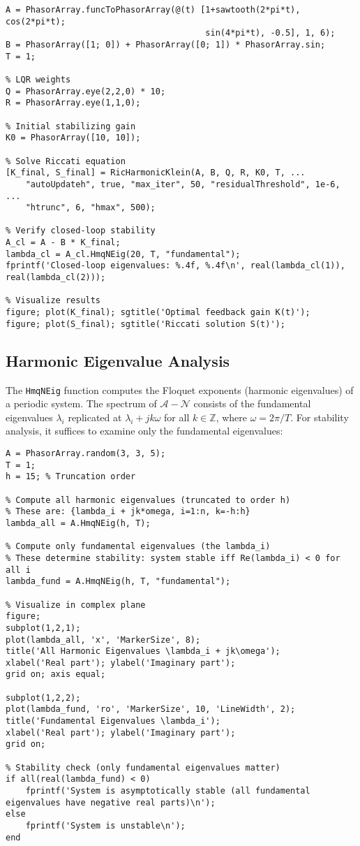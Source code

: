 \documentclass[11pt,a4paper]{article}
\begin{document}
\begin{lstlisting}[style=matlabstyle]
% Define system matrices
A = PhasorArray.funcToPhasorArray(@(t) [1+sawtooth(2*pi*t), cos(2*pi*t); 
                                        sin(4*pi*t), -0.5], 1, 6);
B = PhasorArray([1; 0]) + PhasorArray([0; 1]) * PhasorArray.sin;
T = 1;

% LQR weights
Q = PhasorArray.eye(2,2,0) * 10;
R = PhasorArray.eye(1,1,0);

% Initial stabilizing gain
K0 = PhasorArray([10, 10]);

% Solve Riccati equation
[K_final, S_final] = RicHarmonicKlein(A, B, Q, R, K0, T, ...
    "autoUpdateh", true, "max_iter", 50, "residualThreshold", 1e-6, ...
    "htrunc", 6, "hmax", 500);

% Verify closed-loop stability
A_cl = A - B * K_final;
lambda_cl = A_cl.HmqNEig(20, T, "fundamental");
fprintf('Closed-loop eigenvalues: %.4f, %.4f\n', real(lambda_cl(1)), real(lambda_cl(2)));

% Visualize results
figure; plot(K_final); sgtitle('Optimal feedback gain K(t)');
figure; plot(S_final); sgtitle('Riccati solution S(t)');
\end{lstlisting}

\subsection{Harmonic Eigenvalue Analysis}

The \texttt{HmqNEig} function computes the Floquet exponents (harmonic eigenvalues) of a periodic system. The spectrum of $\mathcal{A} - \mathcal{N}$ consists of the fundamental eigenvalues $\lambda_i$ replicated at $\lambda_i + jk\omega$ for all $k \in \mathbb{Z}$, where $\omega = 2\pi/T$. For stability analysis, it suffices to examine only the fundamental eigenvalues:

\begin{lstlisting}[style=matlabstyle]
% Stability analysis of periodic system
A = PhasorArray.random(3, 3, 5);
T = 1;
h = 15; % Truncation order

% Compute all harmonic eigenvalues (truncated to order h)
% These are: {lambda_i + jk*omega, i=1:n, k=-h:h}
lambda_all = A.HmqNEig(h, T);

% Compute only fundamental eigenvalues (the lambda_i)
% These determine stability: system stable iff Re(lambda_i) < 0 for all i
lambda_fund = A.HmqNEig(h, T, "fundamental");

% Visualize in complex plane
figure;
subplot(1,2,1);
plot(lambda_all, 'x', 'MarkerSize', 8);
title('All Harmonic Eigenvalues \lambda_i + jk\omega');
xlabel('Real part'); ylabel('Imaginary part');
grid on; axis equal;

subplot(1,2,2);
plot(lambda_fund, 'ro', 'MarkerSize', 10, 'LineWidth', 2);
title('Fundamental Eigenvalues \lambda_i');
xlabel('Real part'); ylabel('Imaginary part');
grid on;

% Stability check (only fundamental eigenvalues matter)
if all(real(lambda_fund) < 0)
    fprintf('System is asymptotically stable (all fundamental eigenvalues have negative real parts)\n');
else
    fprintf('System is unstable\n');
end
\end{lstlisting}
\end{document}

